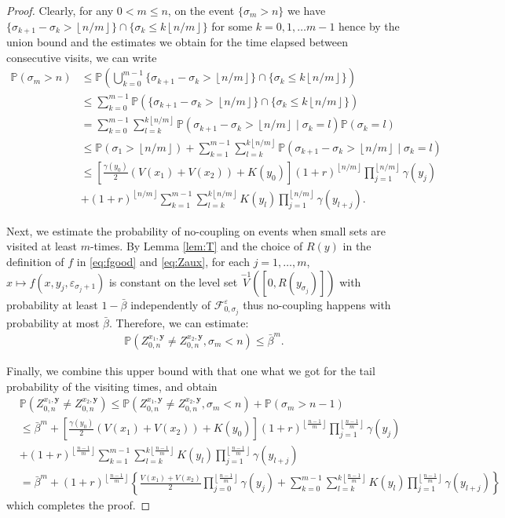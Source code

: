 \documentclass[10pt,a4paper]{amsart}
\newcommand{\F}{\mathcal{F}}
\newcommand{\eps}{\varepsilon}
\newcommand{\ga}{\gamma}
\newcommand{\lfrf}[1]{\left\lfloor #1\right\rfloor}
\renewcommand{\P}{\mathbb{P}}
\begin{document}
\begin{proof}
	Clearly, for any $0<m\le n$, on the event $\{\sigma_m>n\}$ we have $\{\sigma_{k+1}-\sigma_{k}>\lfrf{n/m}\}\cap\{\sigma_{k}\le k\lfrf{n/m}\}$ for some $k=0,1,\ldots m-1$ hence by the union bound and the estimates we obtain for the time elapsed between consecutive visits, we can write
	\begin{align*}
		\P (\sigma_m>n)&\le \P \left(\bigcup_{k=0}^{m-1} \{\sigma_{k+1}-\sigma_{k}>\lfrf{n/m}\}\cap\{\sigma_{k}\le k\lfrf{n/m}\}\right)
		\\
		&\le 
		\sum_{k=0}^{m-1}\P \left(\{\sigma_{k+1}-\sigma_{k}>\lfrf{n/m}\}\cap\{\sigma_{k}\le k\lfrf{n/m}\}\right)
		\\
		&=
		\sum_{k=0}^{m-1}\sum_{l=k}^{k\lfrf{n/m}}
		\P \left(\sigma_{k+1}-\sigma_{k}>\lfrf{n/m}\mid \sigma_{k}=l\right)\P(\sigma_{k}=l)
		\\
		&\le 
		\P(\sigma_{1}>\lfrf{n/m})+
			\sum_{k=1}^{m-1}\sum_{l=k}^{k\lfrf{n/m}}
		\P \left(\sigma_{k+1}-\sigma_{k}>\lfrf{n/m}\mid \sigma_{k}=l\right)
	\\
	&\le 
	\left[\frac{\ga (y_0)}{2}\left(V(x_1)+V(x_2)\right)+K(y_0)\right]
	(1+r)^{\lfrf{n/m}} \prod_{j=1}^{\lfrf{n/m}}\ga (y_j)
	\\
	&+
	(1+r)^{\lfrf{n/m}}\sum_{k=1}^{m-1}\sum_{l=k}^{k\lfrf{n/m}} K(y_l)\prod_{j=1}^{\lfrf{n/m}}\ga (y_{l+j}).
	\end{align*}
	
	Next, we estimate the probability of no-coupling on events when small sets are visited at least $m$-times. By Lemma \ref{lem:T} and the choice of $R(y)$ in the definition of $f$ in \eqref{eq:fgood} and \eqref{eq:Zaux}, for each $j=1,\ldots,m$, $x \mapsto f(x,y_j,\eps_{\sigma_j+1})$ is constant on the level set $\stackrel{-1}{V}([0,R(y_{\sigma_j})])$ with probability at least $1-\bar{\beta}$ 
	independently of $\F_{0,\sigma_j}^\eps$ thus no-coupling happens with probability at most $\bar{\beta}$.
	Therefore, we can estimate:
	\begin{align*}
	\P (Z_{0,n}^{x_1,\mathbf{y}}\ne Z_{0,n}^{x_2,\mathbf{y}},\sigma_{m}<n) 
	\le \bar{\beta}^m. 
	\end{align*}
	
	Finally, we combine this upper bound with that one what we got for the tail probability of the visiting times, and obtain
	\begin{align*}
	&\P (Z_{0,n}^{x_1,\mathbf{y}}\ne Z_{0,n}^{x_2,\mathbf{y}})
	\le 
	\P (Z_{0,n}^{x_1,\mathbf{y}}\ne Z_{0,n}^{x_2,\mathbf{y}},\sigma_{m}<n)
	+
	\P (\sigma_{m}> n-1)\\
	& \le
	\bar{\beta}^m
	+
	\left[\frac{\ga (y_0)}{2}\left(V(x_1)+V(x_2)\right)+K(y_0)\right]
	(1+r)^{\lfrf{\frac{n-1}{m}}} \prod_{j=1}^{\lfrf{\frac{n-1}{m}}}\ga (y_j)
	\\
	&+
	(1+r)^{\lfrf{\frac{n-1}{m}}}\sum_{k=1}^{m-1}\sum_{l=k}^{k\lfrf{\frac{n-1}{m}}} K(y_l)\prod_{j=1}^{\lfrf{\frac{n-1}{m}}}\ga (y_{l+j})
	\\
	&=
	\bar{\beta}^m
	+
	(1+r)^{\lfrf{\frac{n-1}{m}}}\left\{
	\frac{V(x_1)+V(x_2)}{2}\prod_{j=0}^{\lfrf{\frac{n-1}{m}}}\ga (y_j)
	+
	\sum_{k=0}^{m-1}\sum_{l=k}^{k\lfrf{\frac{n-1}{m}}} K(y_l)\prod_{j=1}^{\lfrf{\frac{n-1}{m}}}\ga (y_{l+j})
	\right\}
	\end{align*}
	which completes the proof.
	
\end{proof}
\end{document}
